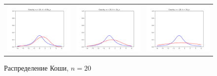 	\begin{figure}[H]
		\centering
		\begin{tabular}{ccc}
			\includegraphics[width=55mm, height =0.25\textheight]{pics/ker_c_20_1.png}
			&
			\includegraphics[width=55mm, height =0.25\textheight]{pics/ker_c_20_2.png}
			&
			\includegraphics[width=55mm, height =0.25\textheight]{pics/ker_c_20_3.png}
		\end{tabular}
		\caption{Распределение Коши, $n = 20$}
		\label{fig:cauchy}
	\end{figure}

